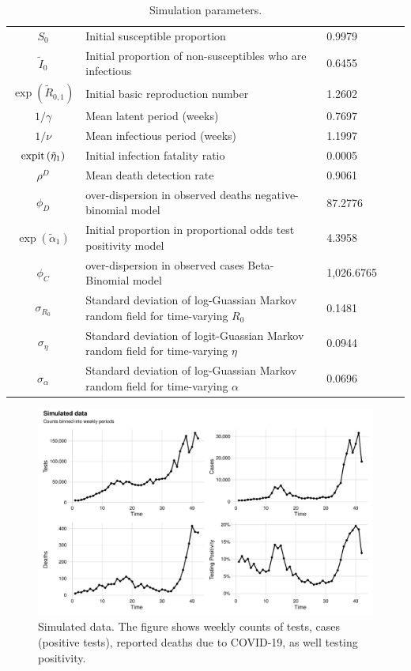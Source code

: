 \begin{table}%
	\caption[Simulation parameters.]{Simulation parameters.}
	\label{ch_4:table:simulation_parameters}
	\scriptsize\centering
	\begin{tabularx}{\columnwidth}{cXllc}
	\thead{Parameter} & \thead{Interpretation} & \thead{Value}  \\ \hline
$S_0$ & Initial susceptible proportion & 0.9979 \\
$\tilde{I}_{0}$ & Initial proportion of non-susceptibles who are infectious & 0.6455 \\
$\exp\left(\tilde{R}_{0,1}\right)$ & Initial basic reproduction number & 1.2602 \\
$1 / \gamma$ & Mean latent period (weeks) &  0.7697 \\
$1 / \nu$ & Mean infectious period (weeks) & 1.1997 \\
$\operatorname{expit}\left(\tilde{\eta}_1\right)$ & Initial infection fatality ratio & 0.0005 \\
$\rho^D$ & Mean death detection rate &  0.9061 \\
$\phi_D$ & over-dispersion in observed deaths negative-binomial model & 87.2776 \\
$\exp\left(\tilde{\alpha}_1\right)$ & Initial proportion in proportional odds test positivity model & 4.3958 \\
$\phi_C$ & over-dispersion in observed cases Beta-Binomial model & 1,026.6765 \\
$\sigma_{R_0}$ & Standard deviation of log-Guassian Markov random field for time-varying $R_0$ & 0.1481 \\
$\sigma_\eta$ & Standard deviation of logit-Guassian Markov random field for time-varying $\eta$ & 0.0944 \\
$\sigma_\alpha$ & Standard deviation of log-Guassian Markov random field for time-varying $\alpha$ & 0.0696 \\
\hline
	\end{tabularx}
\end{table}

\begin{figure}[h]
    \centering
    \includegraphics[width=1.0\columnwidth]{simulated_binned_data_plot}
    \caption{
    Simulated data.
    The figure shows weekly counts of tests, cases (positive tests), reported deaths due to COVID-19, as well testing positivity.}
    \label{ch_4:fig:simulated_binned_data_plot}
\end{figure}

